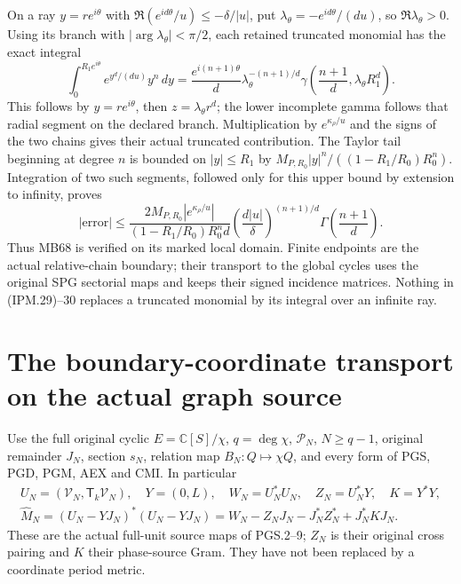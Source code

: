 \documentclass[11pt,a4paper]{article}
\theoremstyle{definition}
\begin{document}
On a ray \(y=re^{i\theta}\) with
\(\Re(e^{id\theta}/u)\le-\delta/|u|\), put
\(\lambda_\theta=-e^{id\theta}/(du)\), so \(\Re\lambda_\theta>0\).
Using its branch with \(|\arg\lambda_\theta|<\pi/2\), each retained
truncated monomial has the exact integral
\[
 \int_0^{R_1e^{i\theta}}e^{y^d/(du)}y^n\,dy
 =\frac{e^{i(n+1)\theta}}d
       \lambda_\theta^{-(n+1)/d}
       \gamma\left(\frac{n+1}d,\lambda_\theta R_1^d\right).
 \tag{IPM.29}
\]
This follows by \(y=re^{i\theta}\), then \(z=\lambda_\theta r^d\);
the lower incomplete gamma follows that radial segment on the declared
branch. Multiplication by \(e^{\kappa_\rho/u}\) and the signs of the
two chains gives their actual truncated contribution. The Taylor tail
beginning at degree \(n\) is bounded on \(|y|\le R_1\) by
\(M_{P,R_0}|y|^n/((1-R_1/R_0)R_0^n)\). Integration of two such
segments, followed only for this upper bound by extension to infinity,
proves
\[
 |\mathrm{error}|
 \le\frac{2M_{P,R_0}|e^{\kappa_\rho/u}|}
       {(1-R_1/R_0)R_0^n d}
       \left(\frac{d|u|}\delta\right)^{(n+1)/d}
                       \Gamma\left(\frac{n+1}d\right).
 \tag{IPM.30}
\]
Thus MB68 is verified on its marked local domain. Finite endpoints are
the actual relative-chain boundary; their transport to the global cycles
uses the original SPG sectorial maps and keeps their signed incidence
matrices. Nothing in (IPM.29)--30 replaces a truncated monomial by its
integral over an infinite ray.

\section{The boundary-coordinate transport on the actual graph source}
\label{sec:ipm-graph-transport}

Use the full original cyclic \(E=\mathbb C[S]/\chi\), \(q=\deg\chi\),
\(\mathcal P_N\), \(N\ge q-1\), original remainder \(J_N\),
section \(s_N\), relation map \(B_N:Q\mapsto\chi Q\), and every
form of PGS, PGD, PGM, AEX and CMI. In particular
\[
 \begin{gathered}
 U_N=(\mathcal V_N,\mathsf T_k\mathcal V_N),\quad Y=(0,L),\quad
 W_N=U_N^*U_N,\quad Z_N=U_N^*Y,\quad K=Y^*Y,\\
 \widehat M_N=(U_N-YJ_N)^*(U_N-YJ_N)
   =W_N-Z_NJ_N-J_N^*Z_N^*+J_N^*KJ_N.
 \end{gathered}
 \tag{IPM.31}
\]
These are the actual full-unit source maps of PGS.2--9;
\(Z_N\) is their original cross pairing and \(K\) their phase-source
Gram. They have not been replaced by a coordinate period metric.
\end{document}
